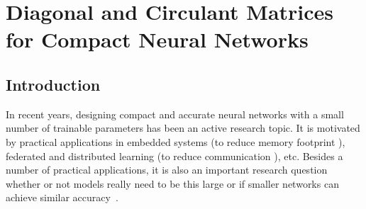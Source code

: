 \chapter{Diagonal and Circulant Matrices for Compact Neural Networks}
\label{chapter:ch4-diagonal_circulant_neural_network}
\localtoc


\section{Introduction}
\label{chapter:ch4-introduction}


In recent years, designing compact and accurate neural networks with a small number of trainable parameters has been an active research topic.
It is motivated by practical applications in embedded systems (to reduce memory footprint \cite{sainath2015convolutional}), federated and distributed learning (to reduce communication \cite{konecny2016federated}), etc.
Besides a number of practical applications, it is also an important research question whether or not models really need to be this large or if smaller networks can achieve similar accuracy~\cite{ba2014deep}.


